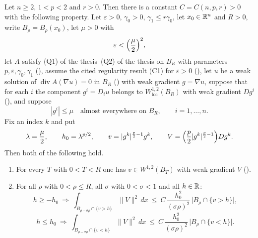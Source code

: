 \begin{lemma}
Let $n\ge2$, $1<p<2$ and $r>0$.  Then there is a constant
$C=C(n,p,r)>0$ with the following property.  Let
$\varepsilon>0$, $\gamma_0>0$, $\gamma_1\le r\gamma_0$, let
$x_0\in\mathbb{R}^n$ and $R>0$, write $B_\rho=B_\rho(x_0)$, let $\mu>0$ with
\[
\varepsilon<\Bigl(\frac\mu2\Bigr)^{2},
\]
let $A$ satisfy (Q1) of the thesis--(Q2) of the thesis on $B_R$ with parameters
$p,\varepsilon,\gamma_0,\gamma_1$ (), assume the
cited regularity result (C1) for $\varepsilon>0$
(), let $u$ be a weak solution of
$\operatorname{div}A(\nabla u)=0$ in $B_R$ () with weak
gradient $g=\nabla u$, suppose that for each $i$ the component $g^i=D_iu$
belongs to $W^{1,2}_{\mathrm{loc}}(B_R)$ with weak gradient $Dg^i$
(), and suppose
\[
|g^i|\le\mu\quad\text{almost everywhere on }B_R,\qquad i=1,\dots,n .
\]
Fix an index $k$ and put
\[
\lambda=\frac\mu2,\qquad h_0=\lambda^{p/2},\qquad
v=|g^k|^{\frac p2-1}g^k,\qquad
V=\Bigl(\frac p2|g^k|^{\frac p2-1}\Bigr)Dg^k .
\]
Then both of the following hold.
\begin{enumerate}
\item For every $T$ with $0<T<R$ one has $v\in W^{1,2}(B_T)$ with weak gradient
  $V$ ().
\item For all $\rho$ with $0<\rho\le R$, all $\sigma$ with $0<\sigma<1$ and all
  $h\in\mathbb{R}$:
  \[
  h\ge-h_0\ \Longrightarrow\
  \int_{B_{\rho-\sigma\rho}\cap\{v>h\}}\|V\|^2\,dx
  \ \le\ C\,\frac{h_0^2}{(\sigma\rho)^2}\,\bigl|B_\rho\cap\{v>h\}\bigr| ,
  \]
  \[
  h\le h_0\ \Longrightarrow\
  \int_{B_{\rho-\sigma\rho}\cap\{v<h\}}\|V\|^2\,dx
  \ \le\ C\,\frac{h_0^2}{(\sigma\rho)^2}\,\bigl|B_\rho\cap\{v<h\}\bigr| .
  \]
\end{enumerate}


\end{lemma}

